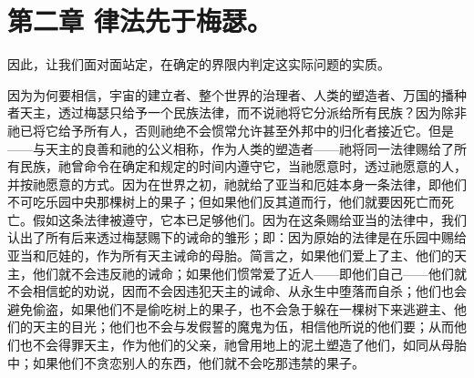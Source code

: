 
\section{第二章 律法先于梅瑟。}

因此，让我们面对面站定，在确定的界限内判定这实际问题的实质。\par

因为为何要相信，宇宙的建立者、整个世界的治理者、人类的塑造者、万国的播种者天主，透过梅瑟只给予一个民族法律，而不说祂将它分派给所有民族？因为除非祂已将它给予所有人，否则祂绝不会惯常允许甚至外邦中的归化者接近它。但是——与天主的良善和祂的公义相称，作为人类的塑造者——祂将同一法律赐给了所有民族，祂曾命令在确定和规定的时间内遵守它，当祂愿意时，透过祂愿意的人，并按祂愿意的方式。因为在世界之初，祂就给了亚当和厄娃本身一条法律，即他们不可吃乐园中央那棵树上的果子；但如果他们反其道而行，他们就要因死亡而死亡。假如这条法律被遵守，它本已足够他们。因为在这条赐给亚当的法律中，我们认出了所有后来透过梅瑟赐下的诫命的雏形；即：因为原始的法律是在乐园中赐给亚当和厄娃的，作为所有天主诫命的母胎。简言之，如果他们爱上了主、他们的天主，他们就不会违反祂的诫命；如果他们惯常爱了近人——即他们自己——他们就不会相信蛇的劝说，因而不会因违犯天主的诫命、从永生中堕落而自杀；他们也会避免偷盗，如果他们不是偷吃树上的果子，也不会急于躲在一棵树下来逃避主、他们的天主的目光；他们也不会与发假誓的魔鬼为伍，相信他所说的他们要；从而他们也不会得罪天主，作为他们的父亲，祂曾用地上的泥土塑造了他们，如同从母胎中；如果他们不贪恋别人的东西，他们就不会吃那违禁的果子。\par

